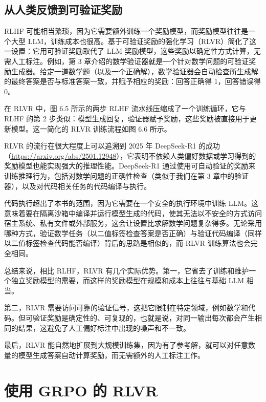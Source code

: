 \subsection{从人类反馈到可验证奖励}

RLHF 可能相当繁琐，因为它需要额外训练一个奖励模型，而奖励模型往往是一个大型 LLM，训练成本也很高。基于可验证奖励的强化学习（RLVR）简化了这一设置：它用可验证奖励取代了 LLM 奖励模型，这些奖励以确定性方式计算，无需人工标注。例如，第 3 章介绍的数学验证器就是一个针对数学问题的可验证奖励生成器。给定一道数学题（以及一个正确解），数学验证器会自动检查所生成解的最终答案是否与标准答案一致，并赋予相应的奖励：回答正确得 1，回答错误得 0。

在 RLVR 中，图 6.5 所示的两步 RLHF 流水线压缩成了一个训练循环，它与 RLHF 的第 2 步类似：模型生成回复，验证器赋予奖励，这些奖励被直接用于更新模型。这一简化的 RLVR 训练流程如图 6.6 所示。


RLVR 的流行在很大程度上可以追溯到 2025 年 DeepSeek-R1 的成功（\href{https://arxiv.org/abs/2501.12948}{https://arxiv.org/abs/2501.12948}），它表明不依赖人类偏好数据或学习得到的奖励模型也能实现强大的推理性能。DeepSeek-R1 通过使用可自动验证的奖励来训练推理行为，包括对数学问题的正确性检查（类似于我们在第 3 章中的验证器），以及对代码相关任务的代码编译与执行。

代码执行超出了本书的范围，因为它需要在一个安全的执行环境中训练 LLM。这意味着要在隔离沙箱中编译并运行模型生成的代码，使其无法以不安全的方式访问宿主系统、私有文件或外部服务，这会让设置比求解数学问题复杂得多。无论采用哪种方式，验证数学任务（以二值标签检查答案是否正确）与验证代码编译（同样以二值标签检查代码能否编译）背后的思路是相似的，而 RLVR 训练算法也会完全相同。

总结来说，相比 RLHF，RLVR 有几个实际优势。第一，它省去了训练和维护一个独立奖励模型的需要，而这样的奖励模型在规模和成本上往往与基础 LLM 相当。

第二，RLVR 需要访问可靠的验证信号，这把它限制在特定领域，例如数学和代码。但可验证奖励是确定性的、可复现的，也就是说，对同一输出每次都会产生相同的结果，这避免了人工偏好标注中出现的噪声和不一致。

最后，RLVR 能自然地扩展到大规模训练集，因为有了参考解，就可以对任意数量的模型生成答案自动计算奖励，而无需额外的人工标注工作。

\section{使用 GRPO 的 RLVR}

